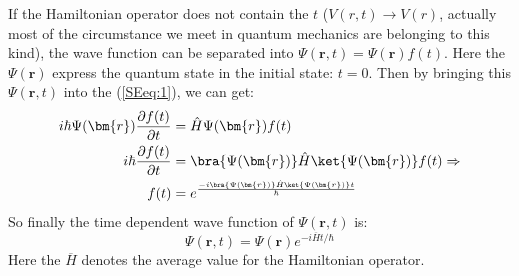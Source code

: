 If the Hamiltonian operator does not contain the $t$ ($V(r,t)
\rightarrow V(r)$, actually most of the circumstance we meet in
quantum mechanics are belonging to this kind), the wave function can
be separated into $\Psi(\bm{r},t) = \Psi(\bm{r})f(t)$. Here the
$\Psi(\bm{r})$ express the quantum state in the initial state:
$t=0$. Then by bringing this $\Psi(\bm{r},t)$ into the
(\ref{SEeq:1}), we can get:
\begin{align}\label{SEeq:17}
i \hbar \Psi(\bm{r})\frac{\partial f(t)}{\partial t} &=
\hat{H}\Psi(\bm{r})f(t) \nonumber \\
i \hbar \frac{\partial f(t)}{\partial t}  &=
\bra{\Psi(\bm{r})}\hat{H}\ket{\Psi(\bm{r})}f(t) \Rightarrow \nonumber \\
f(t) &=
e^{\frac{-i\bra{\Psi(\bm{r})}\hat{H}\ket{\Psi(\bm{r})}t}{\hbar}}
\end{align}
So finally the time dependent wave function of $\Psi(\bm{r},t)$ is:
\begin{equation}\label{}
\Psi(\bm{r},t) = \Psi(\bm{r})e^{-i\overline{H}t/\hbar}
\end{equation}
Here the $\overline{H}$ denotes the average value for the
Hamiltonian operator.

